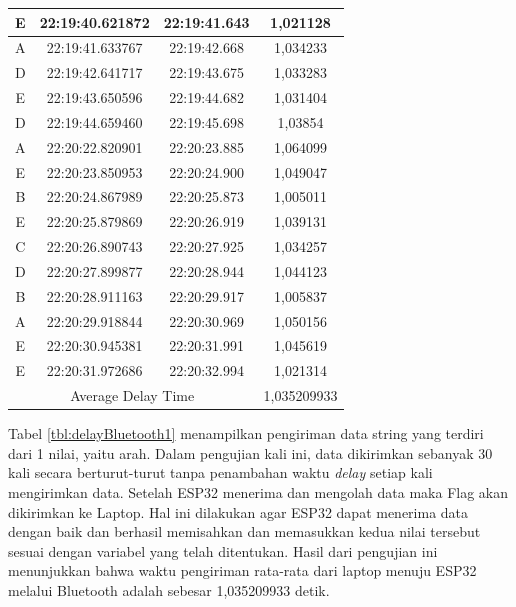 \begin{longtable}{|ccc|c|}
  \multicolumn{1}{|c|}{E}    & \multicolumn{1}{c|}{22:19:40.621872} & 22:19:41.643       & 1,021128    \\ \hline
  \multicolumn{1}{|c|}{A}    & \multicolumn{1}{c|}{22:19:41.633767} & 22:19:42.668       & 1,034233    \\ \hline
  \multicolumn{1}{|c|}{D}    & \multicolumn{1}{c|}{22:19:42.641717} & 22:19:43.675       & 1,033283    \\ \hline
  \multicolumn{1}{|c|}{E}    & \multicolumn{1}{c|}{22:19:43.650596} & 22:19:44.682       & 1,031404    \\ \hline
  \multicolumn{1}{|c|}{D}    & \multicolumn{1}{c|}{22:19:44.659460} & 22:19:45.698       & 1,03854     \\ \hline
  \multicolumn{1}{|c|}{A}    & \multicolumn{1}{c|}{22:20:22.820901} & 22:20:23.885       & 1,064099    \\ \hline
  \multicolumn{1}{|c|}{E}    & \multicolumn{1}{c|}{22:20:23.850953} & 22:20:24.900       & 1,049047    \\ \hline
  \multicolumn{1}{|c|}{B}    & \multicolumn{1}{c|}{22:20:24.867989} & 22:20:25.873       & 1,005011    \\ \hline
  \multicolumn{1}{|c|}{E}    & \multicolumn{1}{c|}{22:20:25.879869} & 22:20:26.919       & 1,039131    \\ \hline
  \multicolumn{1}{|c|}{C}    & \multicolumn{1}{c|}{22:20:26.890743} & 22:20:27.925       & 1,034257    \\ \hline
  \multicolumn{1}{|c|}{D}    & \multicolumn{1}{c|}{22:20:27.899877} & 22:20:28.944       & 1,044123    \\ \hline
  \multicolumn{1}{|c|}{B}    & \multicolumn{1}{c|}{22:20:28.911163} & 22:20:29.917       & 1,005837    \\ \hline
  \multicolumn{1}{|c|}{A}    & \multicolumn{1}{c|}{22:20:29.918844} & 22:20:30.969       & 1,050156    \\ \hline
  \multicolumn{1}{|c|}{E}    & \multicolumn{1}{c|}{22:20:30.945381} & 22:20:31.991       & 1,045619    \\ \hline
  \multicolumn{1}{|c|}{E}    & \multicolumn{1}{c|}{22:20:31.972686} & 22:20:32.994       & 1,021314    \\ \hline
  \multicolumn{3}{|c|}{Average Delay Time}                                               & 1,035209933 \\ \hline
  \end{longtable}

Tabel \ref{tbl:delayBluetooth1} menampilkan pengiriman data string yang terdiri dari 1 nilai, yaitu arah. Dalam pengujian kali ini, data dikirimkan sebanyak 30 kali secara berturut-turut tanpa penambahan waktu \emph{delay} setiap kali mengirimkan data. Setelah ESP32 menerima dan mengolah data maka Flag akan dikirimkan ke Laptop. Hal ini dilakukan agar ESP32 dapat menerima data dengan baik dan berhasil memisahkan dan memasukkan kedua nilai tersebut sesuai dengan variabel yang telah ditentukan. Hasil dari pengujian ini menunjukkan bahwa waktu pengiriman rata-rata dari laptop menuju ESP32 melalui Bluetooth adalah sebesar 1,035209933 detik.

